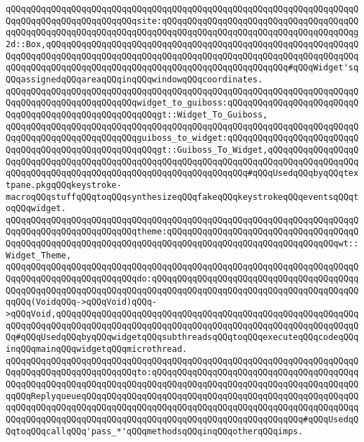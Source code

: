 \verb|qQQqqQQqqQQqqQQqqQQqqQQqqQQqqQQqqQQqqQQqqQQqqQQqqQQqqQQqqQQqqQQqqQQqqQQqqQQqqQQqqQQqqQQqqQQqqQQqsite:qQQqqQQqqQQqqQQqqQQqqQQqqQQqqQQqqQQqqQQqqQQqqQQqqQQqqQQqqQQqqQQqqQQqqQQqqQQqqQQqqQQqqQQqqQQqqQQqqQQqqQQqqQQqg2d::Box,qQQqqQQqqQQqqQQqqQQqqQQqqQQqqQQqqQQqqQQqqQQqqQQqqQQqqQQqqQQqqQQqqQQqqQQqqQQqqQQqqQQqqQQqqQQqqQQqqQQqqQQqqQQqqQQqqQQqqQQqqQQqqQQqqQQqqQQqqQQqqQQqqQQqqQQqqQQqqQQqqQQqqQQqqQQqqQQqqQQqqQQqqQQq#qQQqWidget'sqQQqassignedqQQqareaqQQqinqQQqwindowqQQqcoordinates.|\newline
\verb|qQQqqQQqqQQqqQQqqQQqqQQqqQQqqQQqqQQqqQQqqQQqqQQqqQQqqQQqqQQqqQQqqQQqqQQqqQQqqQQqqQQqqQQqqQQqqQQqwidget_to_guiboss:qQQqqQQqqQQqqQQqqQQqqQQqqQQqqQQqqQQqqQQqqQQqqQQqqQQqqQQqgt::Widget_To_Guiboss,|\newline
\verb|qQQqqQQqqQQqqQQqqQQqqQQqqQQqqQQqqQQqqQQqqQQqqQQqqQQqqQQqqQQqqQQqqQQqqQQqqQQqqQQqqQQqqQQqqQQqqQQqguiboss_to_widget:qQQqqQQqqQQqqQQqqQQqqQQqqQQqqQQqqQQqqQQqqQQqqQQqqQQqqQQqgt::Guiboss_To_Widget,qQQqqQQqqQQqqQQqqQQqqQQqqQQqqQQqqQQqqQQqqQQqqQQqqQQqqQQqqQQqqQQqqQQqqQQqqQQqqQQqqQQqqQQqqQQqqQQqqQQqqQQqqQQqqQQqqQQqqQQqqQQqqQQqqQQqqQQq#qQQqUsedqQQqbyqQQqtextpane.pkgqQQqkeystroke-macroqQQqstuffqQQqtoqQQqsynthesizeqQQqfakeqQQqkeystrokeqQQqeventsqQQqtoqQQqwidget.|\newline
\verb|qQQqqQQqqQQqqQQqqQQqqQQqqQQqqQQqqQQqqQQqqQQqqQQqqQQqqQQqqQQqqQQqqQQqqQQqqQQqqQQqqQQqqQQqqQQqqQQqtheme:qQQqqQQqqQQqqQQqqQQqqQQqqQQqqQQqqQQqqQQqqQQqqQQqqQQqqQQqqQQqqQQqqQQqqQQqqQQqqQQqqQQqqQQqqQQqqQQqqQQqqQQqwt::Widget_Theme,|\newline
\verb|qQQqqQQqqQQqqQQqqQQqqQQqqQQqqQQqqQQqqQQqqQQqqQQqqQQqqQQqqQQqqQQqqQQqqQQqqQQqqQQqqQQqqQQqqQQqqQQqdo:qQQqqQQqqQQqqQQqqQQqqQQqqQQqqQQqqQQqqQQqqQQqqQQqqQQqqQQqqQQqqQQqqQQqqQQqqQQqqQQqqQQqqQQqqQQqqQQqqQQqqQQqqQQqqQQqqQQq(VoidqQQq->qQQqVoid)qQQq->qQQqVoid,qQQqqQQqqQQqqQQqqQQqqQQqqQQqqQQqqQQqqQQqqQQqqQQqqQQqqQQqqQQqqQQqqQQqqQQqqQQqqQQqqQQqqQQqqQQqqQQqqQQqqQQqqQQqqQQqqQQqqQQqqQQqqQQqqQQq#qQQqUsedqQQqbyqQQqwidgetqQQqsubthreadsqQQqtoqQQqexecuteqQQqcodeqQQqinqQQqmainqQQqwidgetqQQqmicrothread.|\newline
\verb|qQQqqQQqqQQqqQQqqQQqqQQqqQQqqQQqqQQqqQQqqQQqqQQqqQQqqQQqqQQqqQQqqQQqqQQqqQQqqQQqqQQqqQQqqQQqqQQqto:qQQqqQQqqQQqqQQqqQQqqQQqqQQqqQQqqQQqqQQqqQQqqQQqqQQqqQQqqQQqqQQqqQQqqQQqqQQqqQQqqQQqqQQqqQQqqQQqqQQqqQQqqQQqqQQqqQQqReplyqueueqQQqqQQqqQQqqQQqqQQqqQQqqQQqqQQqqQQqqQQqqQQqqQQqqQQqqQQqqQQqqQQqqQQqqQQqqQQqqQQqqQQqqQQqqQQqqQQqqQQqqQQqqQQqqQQqqQQqqQQqqQQqqQQqqQQqqQQqqQQqqQQqqQQqqQQqqQQqqQQqqQQqqQQqqQQqqQQqqQQqqQQq#qQQqUsedqQQqtoqQQqcallqQQq'pass_*'qQQqmethodsqQQqinqQQqotherqQQqimps.|\newline
